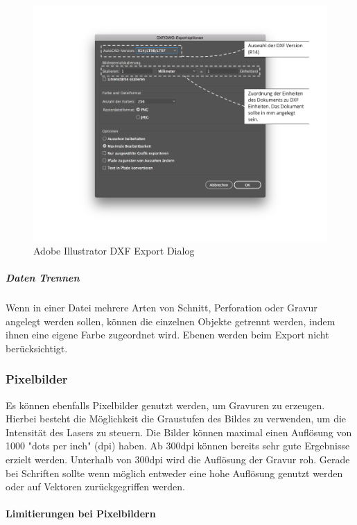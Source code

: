 \documentclass[]{article}
\let\oldparagraph\paragraph
\renewcommand{\paragraph}[1]{\oldparagraph{#1}\mbox{}}
\let\oldsubparagraph\subparagraph
\renewcommand{\subparagraph}[1]{\oldsubparagraph{#1}\mbox{}}
\begin{document}
\begin{figure}
\hypertarget{fig:dxf-ex}{%
\centering
\includegraphics{./assets/images/ai-dxf-export-dialog.png}
\caption{Adobe Illustrator DXF Export Dialog}\label{fig:dxf-ex}
}
\end{figure}

\hypertarget{daten-trennen}{%
\subparagraph{Daten Trennen}\label{daten-trennen}}

Wenn in einer Datei mehrere Arten von Schnitt, Perforation oder Gravur
angelegt werden sollen, können die einzelnen Objekte getrennt werden,
indem ihnen eine eigene Farbe zugeordnet wird. Ebenen werden beim Export
nicht berücksichtigt.

\hypertarget{pixelbilder}{%
\subsubsection{Pixelbilder}\label{pixelbilder}}

Es können ebenfalls Pixelbilder genutzt werden, um Gravuren zu erzeugen.
Hierbei besteht die Möglichkeit die Graustufen des Bildes zu verwenden,
um die Intensität des Lasers zu steuern. Die Bilder können maximal einen
Auflösung von 1000 "dots per inch" (dpi) haben. Ab 300dpi können bereits
sehr gute Ergebnisse erzielt werden. Unterhalb von 300dpi wird die
Auflösung der Gravur roh. Gerade bei Schriften sollte wenn möglich
entweder eine hohe Auflösung genutzt werden oder auf Vektoren
zurückgegriffen werden.

\hypertarget{limitierungen-bei-pixelbildern}{%
\paragraph{Limitierungen bei
Pixelbildern}\label{limitierungen-bei-pixelbildern}}
\end{document}

